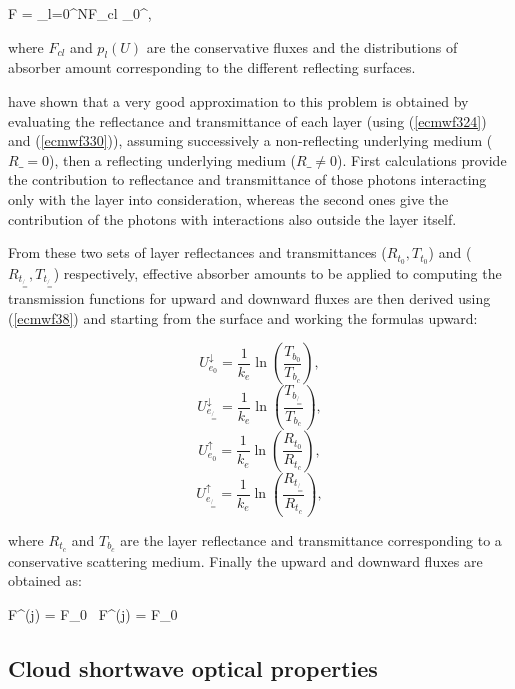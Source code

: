 \medskip
\be
F = \sum_{l=0}^N{F_{cl}} \int_0^{\infty},
\label{ecmwf331}
\ee
\medskip

\noindent where $F_{cl}$ and $p_l(U)$ are the conservative fluxes and the
distributions of absorber amount corresponding to the different reflecting
surfaces.

\citet{Fouquart1980} have shown that a very good approximation to this
problem is obtained by evaluating the reflectance and transmittance of each
layer (using (\ref{ecmwf324}) and (\ref{ecmwf330})), assuming successively a
non-reflecting underlying medium ($R\_ = 0$), then a reflecting underlying
medium ($R\_ \ne 0$). First calculations provide the contribution to reflectance
and transmittance of those photons interacting only with the layer into
consideration, whereas the second ones give the contribution of the photons
with interactions also outside the layer itself.

From these two sets of layer reflectances and transmittances ($R_{t_0},T_{t_0}$)
and ($R_{t_{\not{=}}},T_{t_{\not{=}}}$) respectively, effective absorber amounts
to be applied to computing the transmission functions for upward and downward
fluxes are then derived using (\ref{ecmwf38}) and starting from the surface and
working the formulas upward:

\medskip
\[
U_{e_0}^{\!\downarrow} = \frac{1}{k_e} \ln(\frac{T_{b_0}}{T_{b_c}}),
\]
\[
U_{e_{\not{=}}}^{\!\downarrow} = \frac{1}{k_e} \ln(\frac{T_{b_{\not{=}}}}{T_{b_c}}),
\]
\be
\label{ecmwf332}
\ee
\[
U_{e_0}^{\!\uparrow} = \frac{1}{k_e} \ln(\frac{R_{t_0}}{R_{t_c}}),
\]
\[
U_{e_{\not{=}}}^{\!\uparrow} = \frac{1}{k_e} \ln(\frac{R_{t_{\not{=}}}}{R_{t_c}}),
\]
\medskip

\noindent where $R_{t_c}$ and $T_{b_c}$ are the layer reflectance and
transmittance corresponding to a conservative scattering medium.
Finally the upward and downward fluxes are obtained as:

\medskip
\be
F^{\!\uparrow}(j) = F_0 \, \biggl[R_{t_0} \, t_{\Delta\nu}(U_{e_0}^{\!\uparrow}) + (R_{t_{\not{=}}} - R_{t_0}) \, t_{\Delta\nu}U_{e_{\not{=}}}^{\!\uparrow})\biggr]
\label{ecmwf333a}
\ee
\medskip
\be
F^{\!\downarrow}(j) = F_0 \, \biggl[T_{b_0} \, t_{\Delta\nu}(U_{e_0}^{\!\downarrow}) + (T_{b_{\not{=}}} - T_{b_0}) \, t_{\Delta\nu}U_{e_{\not{=}}}^{\!\downarrow})\biggr]
\label{ecmwf333b}
\ee
\medskip

%
\subsection{Cloud shortwave optical properties}
%

